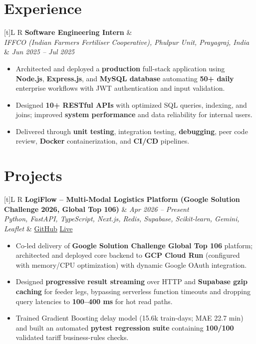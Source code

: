\documentclass[a4paper,10pt]{article}
\newcommand{\resumeSubheading}[4]{
  \vspace{1mm}
  \noindent
  \begin{tabularx}{\textwidth}[t]{L R}
    \textbf{#1} & #4 \\
    \textit{#3} & \textit{#2} \\
  \end{tabularx}
  \vspace{-1mm}
}
\newcommand{\resumeProject}[4]{
  \vspace{1mm}
  \noindent
  \begin{tabularx}{\textwidth}[t]{L R}
    \textbf{#1} & \textit{#3} \\
    \textit{#2} & #4 \\
  \end{tabularx}
  \vspace{-1mm}
}
\begin{document}
\section{Experience}
\small
\resumeSubheading
  {Software Engineering Intern}{Jun 2025 -- Jul 2025}
  {IFFCO (Indian Farmers Fertiliser Cooperative), Phulpur Unit, Prayagraj, India}{}
\begin{itemize}
  \item Architected and deployed a \textbf{production} full-stack application using \textbf{Node.js}, \textbf{Express.js}, and \textbf{MySQL database} automating \textbf{50+ daily} enterprise workflows with JWT authentication and input validation.
  \item Designed \textbf{10+ RESTful APIs} with optimized SQL queries, indexing, and joins; improved \textbf{system performance} and data reliability for internal users.
  \item Delivered through \textbf{unit testing}, integration testing, \textbf{debugging}, peer code review, \textbf{Docker} containerization, and \textbf{CI/CD} pipelines.
\end{itemize}

\section{Projects}
\small

\resumeProject
  {LogiFlow -- Multi-Modal Logistics Platform (Google Solution Challenge 2026, Global Top 106)}
  {Python, FastAPI, TypeScript, Next.js, Redis, Supabase, Scikit-learn, Gemini, Leaflet}
  {Apr 2026 -- Present}
  {\href{https://github.com/Ojas-Srivastava05/LogiFlow-Solution-Challenge-2026}{GitHub} \textbar{} \href{https://logi-flow-solution-challenge-2026.vercel.app/}{Live}}
\begin{itemize}
  \item Co-led delivery of \textbf{Google Solution Challenge Global Top 106} platform; architected and deployed core backend to \textbf{GCP Cloud Run} (configured with memory/CPU optimization) with dynamic Google OAuth integration.
  \item Designed \textbf{progressive result streaming} over HTTP and \textbf{Supabase gzip caching} for feeder legs, bypassing serverless function timeouts and dropping query latencies to \textbf{100--400 ms} for hot read paths.
  \item Trained Gradient Boosting delay model (15.6k train-days; MAE 22.7 min) and built an automated \textbf{pytest regression suite} containing \textbf{100/100} validated tariff business-rules checks.
\end{itemize}
\end{document}
